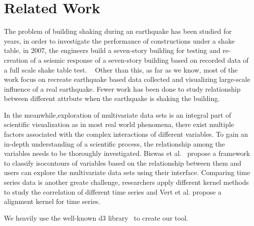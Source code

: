 \section{Related Work}
\label{sec:related}
The problem of building shaking during an earthquake has been studied for years, in order to investigate the performance of constructions under a shake table, in 2007, the engineers build a seven-story building for testing and  re-creation of a seismic response of a seven-story building based on recorded data of a full scale shake table test.  ~\cite{Chourasia:2007:DRS:1247238.1247243} Other than this, as far as we know, most of the work focus on recreate earthquake based data collected and visualizing large-scale influence of a real earthquake. Fewer work has been done to study relationship between different attrbute when the earthquake is shaking the building.

In the meanwhile,exploration of multivariate data sets is an integral part of scientific visualization as in most real world phenomena, there exist multiple factors associated with the complex interactions of different variables. To gain an in-depth understanding of a scientific process, the relationship among the variables needs to be thoroughly investigated. Biswas et al.~\cite{Biswas:2013:AIFEMDS:1077-2626} propose a framework to classify isocontours of variables based on the relationship between them and users can explore the multivariate data sets using their interface. Comparing time series data is another greate challenge, researchers apply different kernel methods to study the correlation of different time series and Vert et al. propose a alignment kernel for time series. ~\cite{DBLP:journals/corr/abs-cs-0610033} 


We heavily use the well-known d3 library~\cite{Bostock:2011:DDD:2068462.2068631} to create our tool.

